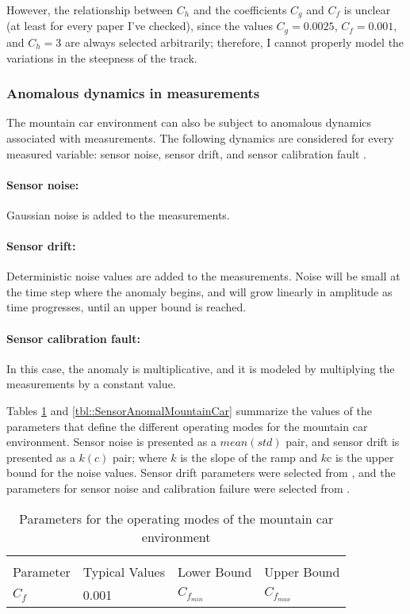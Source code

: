 \documentclass{article}
\begin{document}
However, the relationship between $C_h$ and the coefficients $C_g$ and $C_f$ is unclear (at least for every paper I've checked), since the values $C_g = 0.0025$, $C_f = 0.001$, and $C_h = 3$ are always selected arbitrarily; therefore, I cannot properly model the variations in the steepness of the track.

\subsubsection{Anomalous dynamics in measurements}\label{sec::anomalMountainCar}
The mountain car environment can also be subject to anomalous dynamics associated with measurements. The following dynamics are considered for every measured variable: sensor noise, sensor drift, and sensor calibration fault \cite{Danesh2021}.

\paragraph{Sensor noise:} Gaussian noise is added to the measurements.

\paragraph{Sensor drift:} Deterministic noise values are added to the measurements. Noise will be small at the time step where the anomaly begins, and will grow linearly in amplitude as time progresses, until an upper bound is reached.

\paragraph{Sensor calibration fault:} In this case, the anomaly is multiplicative, and it is modeled by multiplying the measurements by a constant value.

Tables \ref{tbl::MountainCarParams} and \ref{tbl::SensorAnomalMountainCar} summarize the values of the parameters that define the different operating modes for the mountain car environment. Sensor noise is presented as a $mean(std)$ pair, and sensor drift is presented as a $k(c)$ pair; where $k$ is the slope of the ramp and $k\text{c}$ is the upper bound for the noise values. Sensor drift parameters were selected from \cite{Canonaco2020}, and the parameters for sensor noise and calibration failure were selected from \cite{Danesh2021}.


\begin{table}[h!]
  \caption{Parameters for the operating modes of the mountain car environment}
  \label{tbl::MountainCarParams}
  \begin{center}
  \begin{tabular}{l|l|l|l|}
      & \multicolumn{3}{c}{} \\
  Parameter & Typical Values & Lower Bound & Upper Bound \\
   \hline
   $C_f$ & 0.001 & $C_{f_{min}}$ & $C_{f_{max}}$ \\
   \hline
  \end{tabular}
  \end{center}
\end{table}
\end{document}
